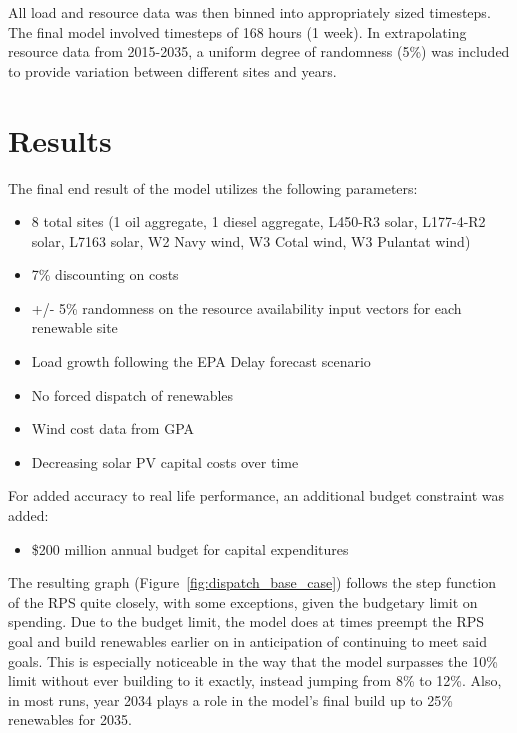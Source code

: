 \documentclass[12pt,letterpaper,fleqn]{article}
\begin{document}
All load and resource data was then binned into appropriately sized
timesteps. The final model involved timesteps of 168 hours (1
week). In extrapolating resource data from 2015-2035, a uniform
degree of randomness (5\%) was included to provide variation between
different sites and years. 

\section{Results}

The final end result of the model utilizes the following parameters:
\begin{itemize}
\item 8 total sites (1 oil aggregate, 1 diesel aggregate, L450-R3
  solar, L177-4-R2 solar, L7163 solar, W2 Navy wind, W3 Cotal wind, W3
  Pulantat wind)
\item 7\% discounting on costs
\item +/- 5\% randomness on the resource availability input vectors
  for each renewable site
\item Load growth following the EPA Delay forecast scenario
\item No forced dispatch of renewables
\item Wind cost data from GPA
\item Decreasing solar PV capital costs over time
\end{itemize}

For added accuracy to real life performance, an additional budget
constraint was added:
\begin{itemize}
\item \$200 million annual budget for capital expenditures
\end{itemize}

The resulting graph (Figure~\ref{fig:dispatch_base_case}) follows the
step function of the RPS quite closely, with some exceptions, given
the budgetary limit on spending. Due to the budget limit, the model
does at times preempt the RPS goal and build renewables earlier on in
anticipation of continuing to meet said goals. This is especially
noticeable in the way that the model surpasses the 10\% limit without
ever building to it exactly, instead jumping from 8\% to 12\%. Also,
in most runs, year 2034 plays a role in the model’s final build up to
25\% renewables for 2035.
\end{document}
